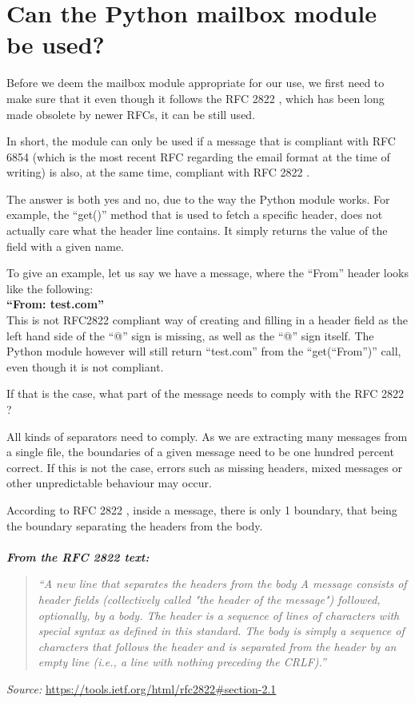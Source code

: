 \documentclass[a4paper,english]{report}
\begin{document}
\section{Can the Python mailbox module be used?}

Before we deem the mailbox module appropriate for our use, we first need to make sure that it even though it follows the RFC 2822 \cite{RFC2822}, which has been long made obsolete by newer RFCs, it can be still used.

In short, the module can only be used if a message that is compliant with RFC 6854 \cite{RFC6854} (which is the most recent RFC regarding the email format at the time of writing) is also, at the same time, compliant with RFC 2822 \cite{RFC2822}. 

The answer is both yes and no, due to the way the Python module works. 
For example, the “get()” method that is used to fetch a specific header, does not actually care what the header line contains. It simply returns the value of the field with a given name.

To give an example, let us say we have a message, where the “From” header looks like the following:\\

\textbf{“From: test.com”}\\

This is not RFC2822 \cite{RFC2822} compliant way of creating and filling in a header field as the left hand side of the “@” sign is missing, as well as the “@” sign itself. The Python module however will still return “test.com” from the “get(“From”)” call, even though it is not compliant.

If that is the case, what part of the message needs to comply with the RFC 2822 \cite{RFC2822}?

All kinds of separators need to comply. As we are extracting many messages from a single file, the boundaries of a given message need to be one hundred percent correct. If this is not the case, errors such as missing headers, mixed messages or other unpredictable behaviour  may occur.

According to RFC 2822 \cite{RFC2822}, inside a message, there is only 1 boundary, that being the boundary separating the headers from the body.\\\\

\textbf{\textit{From the RFC 2822 text:}}
\begin{quotation}
\textit{``A new line that separates the headers from the body
A message consists of header fields (collectively called "the header
of the message") followed, optionally, by a body. The header is a
sequence of lines of characters with special syntax as defined in
this standard. The body is simply a sequence of characters that
follows the header and is separated from the header by an empty line
(i.e., a line with nothing preceding the CRLF).''}\\
\end{quotation}
\textit{Source:} \url{https://tools.ietf.org/html/rfc2822#section-2.1}\\
\end{document}
